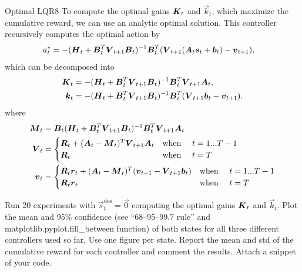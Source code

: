 \begin{questions}
	
\begin{question}{Optimal LQR}{8}
	To compute the optimal gains ${\boldsymbol{K}}_t$ and $\vec k_t$, which maximize the cumulative reward, we can use an analytic optimal solution. This controller recursively computes the optimal action by
	\begin{align}
		a_t^* &= -({\boldsymbol{H}}_t + {\boldsymbol{B}}^T_t {\boldsymbol{V}}_{t+1}{\boldsymbol{B}}_t)^{-1}	{\boldsymbol{B}}^T_t ({\boldsymbol{V}}_{t+1} ({\boldsymbol{A}}_t {\boldsymbol{s}}_t+{\boldsymbol{b}}_t )- {\boldsymbol{v}}_{t+1} ),
	\end{align}
	which can be decomposed into
	\begin{align}
		{\boldsymbol{K}}_t &= -({\boldsymbol{H}}_t + {\boldsymbol{B}}^T_t {\boldsymbol{V}}_{t+1}{\boldsymbol{B}}_t)^{-1}	{\boldsymbol{B}}^T_t {\boldsymbol{V}}_{t+1} {\boldsymbol{A}}_t,
		\\
		{\boldsymbol{k}}_t &= -({\boldsymbol{H}}_t + {\boldsymbol{B}}^T_t {\boldsymbol{V}}_{t+1}{\boldsymbol{B}}_t)^{-1}	{\boldsymbol{B}}^T_t ({\boldsymbol{V}}_{t+1} {\boldsymbol{b}}_t - {\boldsymbol{v}}_{t+1}).
	\end{align}
	where
	\begin{align}
		{\boldsymbol{M}}_t &= {\boldsymbol{B}}_t({\boldsymbol{H}}_t + {\boldsymbol{B}}^T_t {\boldsymbol{V}}_{t+1}{\boldsymbol{B}}_t)^{-1}	{\boldsymbol{B}}^T_t {\boldsymbol{V}}_{t+1} {\boldsymbol{A}}_t
		\\
		{\boldsymbol{V}}_t &=
		\begin{cases}
	       {\boldsymbol{R}}_t + ({\boldsymbol{A}}_t - {\boldsymbol{M}}_t)^T{\boldsymbol{V}}_{t+1}{\boldsymbol{A}}_t & \text{when \quad} t = 1...T-1
	       \\
	       {\boldsymbol{R}}_t & \text{when \quad} t = T
	    \end{cases}
	    \\
		{\boldsymbol{v}}_t &= 
		\begin{cases}
	       {\boldsymbol{R}}_t{\boldsymbol{r}}_t + ({\boldsymbol{A}}_t - {\boldsymbol{M}}_t)^T({\boldsymbol{v}}_{t+1} - {\boldsymbol{V}}_{t+1}{\boldsymbol{b}}_t) & \text{when \quad} t = 1...T-1
	       \\
	       {\boldsymbol{R}}_t{\boldsymbol{r}}_t & \text{when \quad} t = T
	    \end{cases}
	\end{align}		 

	Run 20 experiments with $\vec s^\text{des}_t = \vec 0$ computing the optimal gains ${\boldsymbol{K}}_t$ and $\vec k_t$. Plot the mean and 95\% confidence (see ``68--95--99.7 rule'' and matplotlib.pyplot.fill\_between function) of both states for all three different controllers used so far. Use one figure per state. 
	Report the mean and std of the cumulative reward for each controller and comment the results. Attach a snippet of your code.

\begin{answer}\end{answer}

\end{question}


\end{questions}
